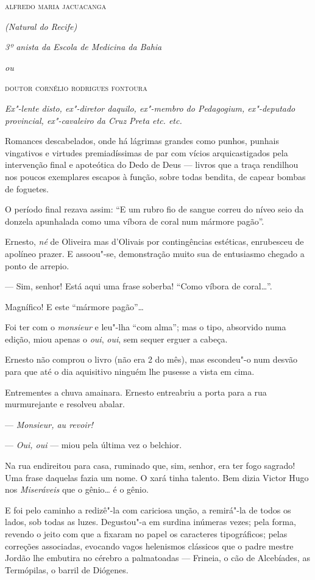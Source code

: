 \textsc{alfredo maria jacuacanga}

\emph{(Natural do Recife)}

\emph{3º anista da Escola de Medicina da Bahia}

\emph{ou}

\textsc{doutor cornélio rodrigues fontoura}

\emph{Ex"-lente disto, ex"-diretor daquilo, ex"-membro do Pedagogium,
ex"-deputado provincial, ex"-cavaleiro da Cruz Preta etc. etc.}

Romances descabelados, onde há lágrimas grandes como punhos, punhais
vingativos e virtudes premiadíssimas de par com vícios arquicastigados
pela intervenção final e apoteótica do Dedo de Deus --- livros que a
traça rendilhou nos poucos exemplares escapos à função, sobre todas
bendita, de capear bombas de foguetes.

O período final rezava assim: ``E um rubro fio de sangue correu do níveo
seio da donzela apunhalada como uma víbora de coral num mármore pagão''.

Ernesto, \emph{né} de Oliveira mas d'Olivais por contingências
estéticas, enrubesceu de apolíneo prazer. E assoou"-se, demonstração
muito sua de entusiasmo chegado a ponto de arrepio.

--- Sim, senhor! Está aqui uma frase soberba! ``Como víbora de
coral\ldots{}''.

Magnífico! E este ``mármore pagão''\ldots{}

Foi ter com o \emph{monsieur} e leu"-lha ``com alma''; mas o tipo,
absorvido numa edição, miou apenas o \emph{oui}, \emph{oui}, sem sequer
erguer a cabeça.

Ernesto não comprou o livro (não era 2 do mês), mas escondeu"-o num
desvão para que até o dia aquisitivo ninguém lhe pusesse a vista em
cima.

Entrementes a chuva amainara. Ernesto entreabriu a porta para a rua
murmurejante e resolveu abalar.

--- \emph{Monsieur, au revoir!}

--- \emph{Oui, oui} --- miou pela última vez o belchior.

Na rua endireitou para casa, ruminado que, sim, senhor, era ter fogo
sagrado! Uma frase daquelas fazia um nome. O xará tinha talento. Bem
dizia Victor Hugo nos \emph{Miseráveis} que o gênio\ldots{} é o gênio.

E foi pelo caminho a redizê"-la com cariciosa unção, a remirá"-la de todos
os lados, sob todas as luzes. Degustou"-a em surdina inúmeras vezes; pela
forma, revendo o jeito com que a fixaram no papel os caracteres
tipográficos; pelas correções associadas, evocando vagos helenismos
clássicos que o padre mestre Jordão lhe embutira no cérebro a
palmatoadas --- Frineia, o cão de Alcebíades, as Termópilas, o barril de
Diógenes.

